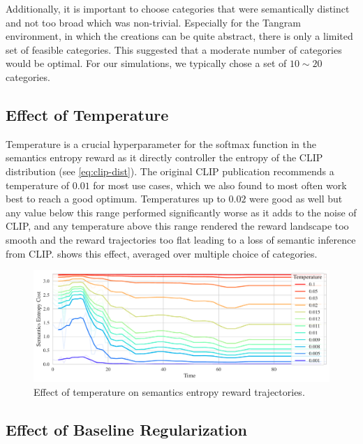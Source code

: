 Additionally, it is important to choose categories that were semantically distinct and not too broad which was non-trivial.
Especially for the Tangram environment, in which the creations can be quite abstract, there is only a limited set of feasible categories.
This suggested that a moderate number of categories would be optimal.
For our simulations, we typically chose a set of \(10 \sim 20\) categories.

\subsection{Effect of Temperature}
\label{sec:reg-temperature}

Temperature is a crucial hyperparameter for the softmax function in the semantics entropy reward as it directly controller the entropy of the CLIP distribution (see \eqref{eq:clip-dist}).
The original CLIP publication recommends a temperature of \(0.01\) for most use cases, which we also found to most often work best to reach a good optimum.
Temperatures up to \(0.02\) were good as well but any value below this range performed significantly worse as it adds to the noise of CLIP, and any temperature above this range rendered the reward landscape too smooth and the reward trajectories too flat leading to a loss of semantic inference from CLIP.
 shows this effect, averaged over multiple choice of categories.

\begin{figure}[H]
    \centering
    \includegraphics[width=\textwidth]{images/temperature_comparison.pdf}
    \caption{Effect of temperature on semantics entropy reward trajectories.}
    \label{fig:clip-temperature}    
\end{figure}

\subsection{Effect of Baseline Regularization}
\label{sec:reg-alpha-beta}

